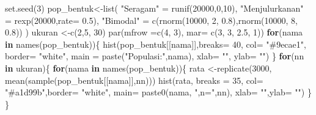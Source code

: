 \documentclass[
  indonesian,
  letterpaper,
]{book}
\newenvironment{Shaded}{\begin{snugshade}}{\end{snugshade}}
\newcommand{\AttributeTok}[1]{\textcolor[rgb]{0.40,0.45,0.13}{#1}}
\newcommand{\ControlFlowTok}[1]{\textcolor[rgb]{0.00,0.23,0.31}{\textbf{#1}}}
\newcommand{\DecValTok}[1]{\textcolor[rgb]{0.68,0.00,0.00}{#1}}
\newcommand{\FloatTok}[1]{\textcolor[rgb]{0.68,0.00,0.00}{#1}}
\newcommand{\FunctionTok}[1]{\textcolor[rgb]{0.28,0.35,0.67}{#1}}
\newcommand{\NormalTok}[1]{\textcolor[rgb]{0.00,0.23,0.31}{#1}}
\newcommand{\OtherTok}[1]{\textcolor[rgb]{0.00,0.23,0.31}{#1}}
\newcommand{\StringTok}[1]{\textcolor[rgb]{0.13,0.47,0.30}{#1}}
\begin{document}
\begin{Shaded}
\begin{Highlighting}[]
\FunctionTok{set.seed}\NormalTok{(}\DecValTok{3}\NormalTok{)}
\NormalTok{pop\_bentuk}\OtherTok{\textless{}{-}}\FunctionTok{list}\NormalTok{(}
\StringTok{"Seragam"} \OtherTok{=} \FunctionTok{runif}\NormalTok{(}\DecValTok{20000}\NormalTok{,}\DecValTok{0}\NormalTok{,}\DecValTok{10}\NormalTok{),}
\StringTok{"Menjulurkanan"} \OtherTok{=} \FunctionTok{rexp}\NormalTok{(}\DecValTok{20000}\NormalTok{,}\AttributeTok{rate=} \FloatTok{0.5}\NormalTok{),}
\StringTok{"Bimodal"} \OtherTok{=} \FunctionTok{c}\NormalTok{(}\FunctionTok{rnorm}\NormalTok{(}\DecValTok{10000}\NormalTok{, }\DecValTok{2}\NormalTok{, }\FloatTok{0.8}\NormalTok{),}\FunctionTok{rnorm}\NormalTok{(}\DecValTok{10000}\NormalTok{, }\DecValTok{8}\NormalTok{, }\FloatTok{0.8}\NormalTok{))}
\NormalTok{)}
\NormalTok{ukuran }\OtherTok{\textless{}{-}}\FunctionTok{c}\NormalTok{(}\DecValTok{2}\NormalTok{,}\DecValTok{5}\NormalTok{, }\DecValTok{30}\NormalTok{)}
\FunctionTok{par}\NormalTok{(}\AttributeTok{mfrow =}\FunctionTok{c}\NormalTok{(}\DecValTok{4}\NormalTok{, }\DecValTok{3}\NormalTok{), }\AttributeTok{mar=} \FunctionTok{c}\NormalTok{(}\DecValTok{3}\NormalTok{, }\DecValTok{3}\NormalTok{, }\FloatTok{2.5}\NormalTok{, }\DecValTok{1}\NormalTok{))}
\ControlFlowTok{for}\NormalTok{(nama }\ControlFlowTok{in} \FunctionTok{names}\NormalTok{(pop\_bentuk))\{}
\FunctionTok{hist}\NormalTok{(pop\_bentuk[[nama]],}\AttributeTok{breaks=} \DecValTok{40}\NormalTok{, }\AttributeTok{col=} \StringTok{"\#9ecae1"}\NormalTok{, }\AttributeTok{border=} \StringTok{"white"}\NormalTok{,}
\AttributeTok{main =} \FunctionTok{paste}\NormalTok{(}\StringTok{"Populasi:"}\NormalTok{,nama), }\AttributeTok{xlab=} \StringTok{""}\NormalTok{, }\AttributeTok{ylab=} \StringTok{""}\NormalTok{)}
\NormalTok{\}}
\ControlFlowTok{for}\NormalTok{(nn }\ControlFlowTok{in}\NormalTok{ ukuran)\{}
\ControlFlowTok{for}\NormalTok{(nama }\ControlFlowTok{in} \FunctionTok{names}\NormalTok{(pop\_bentuk))\{}
\NormalTok{rata }\OtherTok{\textless{}{-}}\FunctionTok{replicate}\NormalTok{(}\DecValTok{3000}\NormalTok{, }\FunctionTok{mean}\NormalTok{(}\FunctionTok{sample}\NormalTok{(pop\_bentuk[[nama]],nn)))}
\FunctionTok{hist}\NormalTok{(rata, }\AttributeTok{breaks =} \DecValTok{35}\NormalTok{, }\AttributeTok{col=} \StringTok{"\#a1d99b"}\NormalTok{,}\AttributeTok{border=} \StringTok{"white"}\NormalTok{,}
\AttributeTok{main=} \FunctionTok{paste0}\NormalTok{(nama, }\StringTok{",n="}\NormalTok{,nn), }\AttributeTok{xlab=} \StringTok{""}\NormalTok{,}\AttributeTok{ylab=} \StringTok{""}\NormalTok{)}
\NormalTok{\}}
\NormalTok{\}}
\end{Highlighting}
\end{Shaded}
\end{document}
